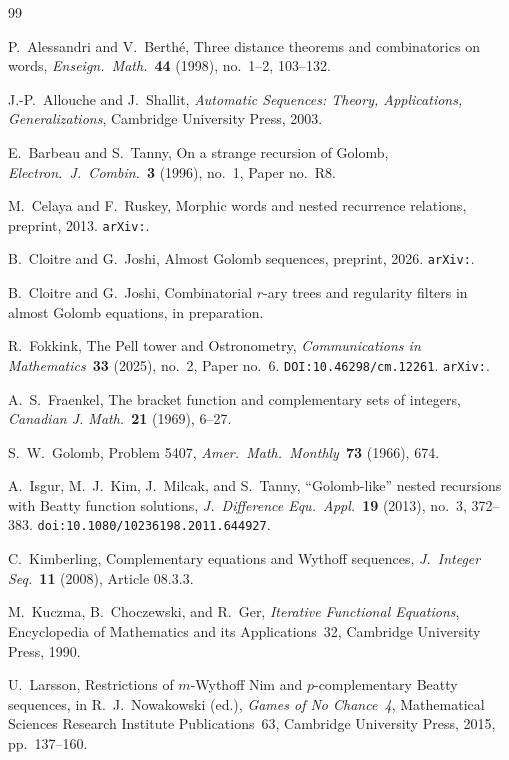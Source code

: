 \documentclass{birkjour}
\theoremstyle{definition}
\theoremstyle{remark}
\begin{document}
\begin{thebibliography}{99}

P.~Alessandri and V.~Berth\'e,
Three distance theorems and combinatorics on words,
\emph{Enseign.\ Math.}\ \textbf{44} (1998), no.~1--2,
103--132.

J.-P.~Allouche and J.~Shallit,
\emph{Automatic Sequences: Theory, Applications,
Generalizations},
Cambridge University Press, 2003.

E.~Barbeau and S.~Tanny,
On a strange recursion of Golomb,
\emph{Electron.\ J.\ Combin.}\ \textbf{3} (1996), no.~1,
Paper no.~R8.

M.~Celaya and F.~Ruskey,
Morphic words and nested recurrence relations,
preprint, 2013.
\texttt{arXiv:}.

B.~Cloitre and G.~Joshi,
Almost Golomb sequences,
preprint, 2026.
\texttt{arXiv:}.

B.~Cloitre and G.~Joshi,
Combinatorial $r$-ary trees and regularity filters in
almost Golomb equations,
in preparation.

R.~Fokkink,
The Pell tower and Ostronometry,
\emph{Communications in Mathematics}\ \textbf{33}
(2025), no.~2, Paper no.~6.
\texttt{DOI:10.46298/cm.12261}.
\texttt{arXiv:}.

A.~S.~Fraenkel,
The bracket function and complementary sets of integers,
\emph{Canadian J. Math.}\ \textbf{21} (1969), 6--27.

S.~W.~Golomb,
Problem 5407,
\emph{Amer.\ Math.\ Monthly}\ \textbf{73} (1966), 674.

A.~Isgur, M.~J.~Kim, J.~Milcak, and S.~Tanny,
``Golomb-like'' nested recursions with Beatty function
solutions,
\emph{J.\ Difference Equ.\ Appl.}\ \textbf{19} (2013),
no.~3, 372--383.
\texttt{doi:10.1080/10236198.2011.644927}.

C.~Kimberling,
Complementary equations and Wythoff sequences,
\emph{J.\ Integer Seq.}\ \textbf{11} (2008),
Article 08.3.3.

M.~Kuczma, B.~Choczewski, and R.~Ger,
\emph{Iterative Functional Equations},
Encyclopedia of Mathematics and its Applications~32,
Cambridge University Press, 1990.

U.~Larsson,
Restrictions of $m$-Wythoff Nim and $p$-complementary
Beatty sequences,
in R.~J.~Nowakowski (ed.),
\emph{Games of No Chance~4},
Mathematical Sciences Research Institute Publications~63,
Cambridge University Press, 2015, pp.~137--160.


\end{thebibliography}
\end{document}
